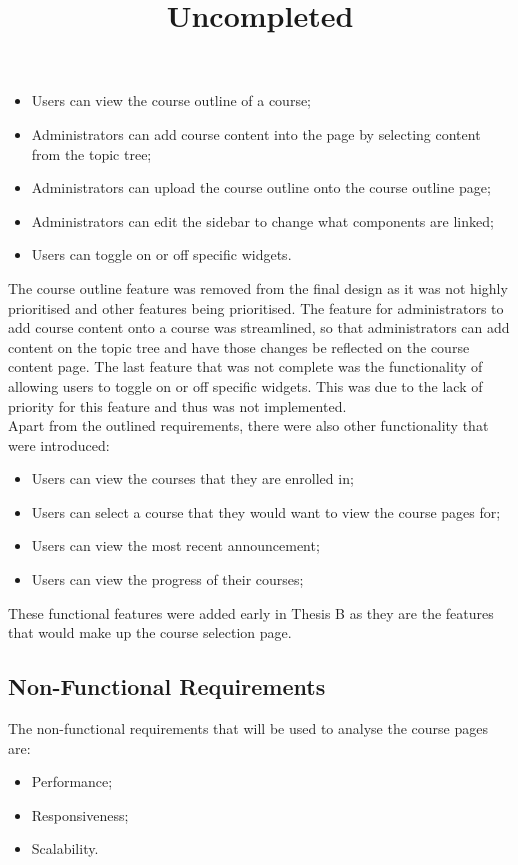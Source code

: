 \title{Uncompleted}
\begin{itemize}
    \item Users can view the course outline of a course;
    \item Administrators can add course content into the page by selecting content from the topic tree;
    \item Administrators can upload the course outline onto the course outline page;
    \item Administrators can edit the sidebar to change what components are linked;
    \item Users can toggle on or off specific widgets.
\end{itemize}

The course outline feature was removed from the final design as it was not highly prioritised and other features being prioritised. 
The feature for administrators to add course content onto a course was streamlined, so that administrators can add content on the topic tree and have those changes be reflected on the course content page.
The last feature that was not complete was the functionality of allowing users to toggle on or off specific widgets. This was due to the lack of priority for this feature and thus was not implemented.\\

Apart from the outlined requirements, there were also other functionality that were introduced:
\begin{itemize}
    \item Users can view the courses that they are enrolled in;
    \item Users can select a course that they would want to view the course pages for;
    \item Users can view the most recent announcement;
    \item Users can view the progress of their courses;
\end{itemize}

These functional features were added early in Thesis B as they are the features that would make up the course selection page.

\subsection{Non-Functional Requirements}
The non-functional requirements that will be used to analyse the course pages are:
\begin{itemize}
    \item Performance;
    \item Responsiveness;
    \item Scalability.
\end{itemize}

